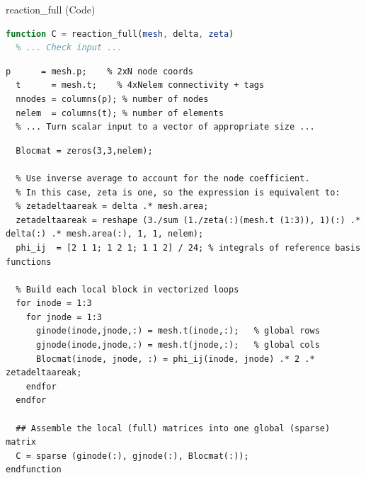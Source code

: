 \documentclass[aspectratio=54,xcolor=dvipsnames]{beamer}
\begin{document}
\begin{frame}[fragile]{reaction\_full (Code)}
\scriptsize
\begin{lstlisting}[language=Octave,firstnumber=19]
function C = reaction_full(mesh, delta, zeta)
  % ... Check input ...
\end{lstlisting}
\begin{lstlisting}[firstnumber=29]
  p      = mesh.p;    % 2xN node coords
  t      = mesh.t;    % 4xNelem connectivity + tags
  nnodes = columns(p); % number of nodes
  nelem  = columns(t); % number of elements
  % ... Turn scalar input to a vector of appropriate size ...
\end{lstlisting}
\begin{lstlisting}[firstnumber=46]
  % Local element matrices: one 3x3 block per element
  Blocmat = zeros(3,3,nelem);

  % Use inverse average to account for the node coefficient.
  % In this case, zeta is one, so the expression is equivalent to:
  % zetadeltaareak = delta .* mesh.area;
  zetadeltaareak = reshape (3./sum (1./zeta(:)(mesh.t (1:3)), 1)(:) .* delta(:) .* mesh.area(:), 1, 1, nelem);
  phi_ij  = [2 1 1; 1 2 1; 1 1 2] / 24; % integrals of reference basis functions

  % Build each local block in vectorized loops
  for inode = 1:3
    for jnode = 1:3
      ginode(inode,jnode,:) = mesh.t(inode,:);   % global rows
      gjnode(inode,jnode,:) = mesh.t(jnode,:);   % global cols
      Blocmat(inode, jnode, :) = phi_ij(inode, jnode) .* 2 .* zetadeltaareak;
    endfor
  endfor

  ## Assemble the local (full) matrices into one global (sparse) matrix
  C = sparse (ginode(:), gjnode(:), Blocmat(:));
endfunction
\end{lstlisting}
\end{frame}
\end{document}
